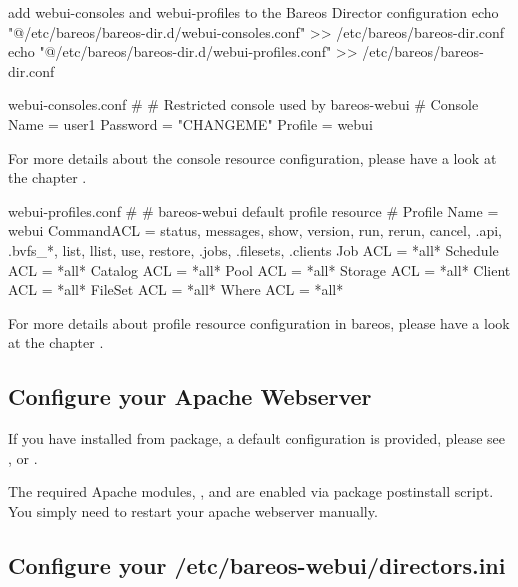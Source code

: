 \begin{commands}{add webui-consoles and webui-profiles to the Bareos Director configuration}
echo "@/etc/bareos/bareos-dir.d/webui-consoles.conf" >> /etc/bareos/bareos-dir.conf
echo "@/etc/bareos/bareos-dir.d/webui-profiles.conf" >> /etc/bareos/bareos-dir.conf
\end{commands}

\begin{bconfig}{webui-consoles.conf}
#
# Restricted console used by bareos-webui
#
Console {
  Name = user1
  Password = "CHANGEME"
  Profile = webui
}
\end{bconfig}

For more details about the console resource configuration, please have a look at the chapter .

\begin{bconfig}{webui-profiles.conf}
#
# bareos-webui default profile resource
#
Profile {
  Name = webui
  CommandACL = status, messages, show, version, run, rerun, cancel, .api, .bvfs_*, list, llist, use, restore, .jobs, .filesets, .clients
  Job ACL = *all*
  Schedule ACL = *all*
  Catalog ACL = *all*
  Pool ACL = *all*
  Storage ACL = *all*
  Client ACL = *all*
  FileSet ACL = *all*
  Where ACL = *all*
}
\end{bconfig}

For more details about profile resource configuration in bareos, please have a look at the chapter .


\subsection{Configure your Apache Webserver}


If you have installed from package, a default configuration is provided, please see ,  or .

The required Apache modules, ,  and  are enabled via package postinstall script. You simply need to restart your apache webserver manually.

\subsection{Configure your /etc/bareos-webui/directors.ini}

